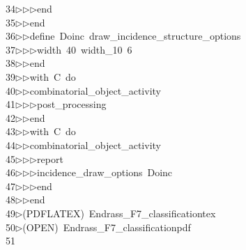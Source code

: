 \begin{tabbing}
34\>$\triangleright$\>$\triangleright$\>$\triangleright$\>end\ \\[0pt]
35\>$\triangleright$\>$\triangleright$\>end\ \\[0pt]
36\>$\triangleright$\>$\triangleright$\>define\ Doinc\ draw\_incidence\_structure\_options\ \\[0pt]
37\>$\triangleright$\>$\triangleright$\>$\triangleright$\>width\ 40\ width\_10\ 6\ \\[0pt]
38\>$\triangleright$\>$\triangleright$\>end\ \\[0pt]
39\>$\triangleright$\>$\triangleright$\>with\ C\ do\ \\[0pt]
40\>$\triangleright$\>$\triangleright$\>combinatorial\_object\_activity\ \\[0pt]
41\>$\triangleright$\>$\triangleright$\>$\triangleright$\>post\_processing\ \\[0pt]
42\>$\triangleright$\>$\triangleright$\>end\ \\[0pt]
43\>$\triangleright$\>$\triangleright$\>with\ C\ do\ \\[0pt]
44\>$\triangleright$\>$\triangleright$\>combinatorial\_object\_activity\ \\[0pt]
45\>$\triangleright$\>$\triangleright$\>$\triangleright$\>report\ \\[0pt]
46\>$\triangleright$\>$\triangleright$\>$\triangleright$\>incidence\_draw\_options\ Doinc\ \\[0pt]
47\>$\triangleright$\>$\triangleright$\>$\triangleright$\>end\ \\[0pt]
48\>$\triangleright$\>$\triangleright$\>end\\[0pt]
49\>$\triangleright$\>(PDFLATEX)\ Endrass\_F7\_classificationtex\\[0pt]
50\>$\triangleright$\>(OPEN)\ Endrass\_F7\_classificationpdf\\[0pt]
51\>\end{tabbing}
